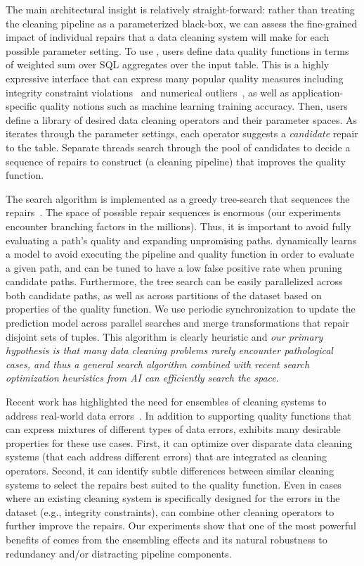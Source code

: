 The main architectural insight is relatively straight-forward: rather than treating the cleaning pipeline as a parameterized black-box, we can assess the fine-grained impact of individual repairs that a data cleaning system will make for each possible parameter setting.
To use \sys, users define data quality functions in terms of weighted sum over SQL aggregates over the input table.  This is a highly expressive interface that can express many popular quality measures including integrity constraint violations~\cite{ilyas2015trends} and numerical outliers~\cite{bailis2017macrobase}, as well as application-specific quality notions such as machine learning training accuracy.
Then, users define a library of desired data cleaning operators and their parameter spaces.
As \sys iterates through the parameter settings, each operator suggests a \emph{candidate} repair to the table.
Separate threads search through the pool of candidates to decide a sequence of repairs to construct (a cleaning pipeline) that improves the quality function.

The search algorithm is implemented as a greedy tree-search that sequences the repairs~\cite{russell2016artificial}.
The space of possible repair sequences is enormous (our experiments encounter branching factors in the millions).
Thus, it is important to avoid fully evaluating a path's quality and expanding unpromising paths.    
\sys dynamically learns a model to avoid executing the pipeline and quality function in order to evaluate a given path, and can be tuned to have a low false positive rate when pruning candidate paths.  
Furthermore, the tree search can be easily parallelized across both candidate paths, as well as across partitions of the dataset based on properties of the quality function.
We use periodic synchronization to update the prediction model across parallel searches and merge transformations that repair disjoint sets of tuples. 
This algorithm is clearly heuristic and \emph{our primary hypothesis is that many data cleaning problems rarely encounter pathological cases, and thus a general search algorithm combined with recent search optimization heuristics from AI can efficiently search the space}.

Recent work has highlighted the need for ensembles of cleaning systems to address real-world data errors~\cite{DBLP:journals/pvldb/AbedjanCDFIOPST16}.  In addition to supporting quality functions that can express mixtures of different types of data errors, \sys exhibits many desirable properties for these use cases.  
First, it can optimize over disparate data cleaning systems (that each address different errors) that are integrated as \sys cleaning operators.  Second, it can identify subtle differences between similar cleaning systems to select the repairs best suited to the quality function.  Even in cases where an existing cleaning system is specifically designed for the errors in the dataset (e.g., integrity constraints), \sys can combine other cleaning operators to further improve the repairs.  Our experiments show that one of the most powerful benefits of \sys comes from the ensembling effects and its natural robustness to redundancy and/or distracting pipeline components.


